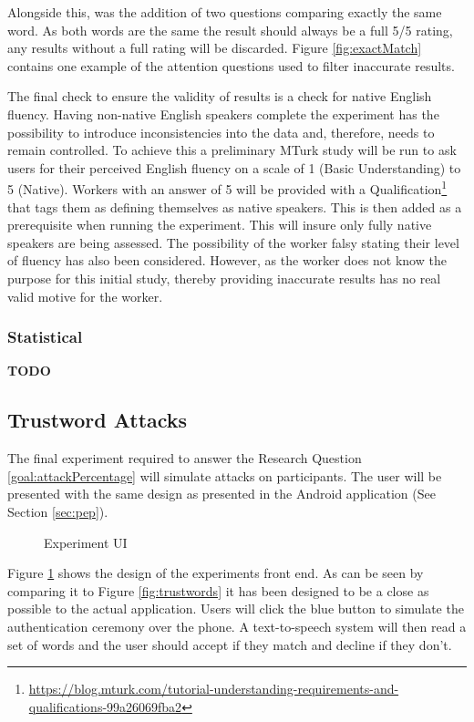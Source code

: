 Alongside this, was the addition of two questions comparing exactly the same word. As both words are the same the result should always be a full 5/5 rating, any results without a full rating will be discarded. Figure \ref{fig:exactMatch} contains one example of the attention questions used to filter inaccurate results.

The final check to ensure the validity of results is a check for native 
English fluency. Having non-native English speakers complete the 
experiment has the possibility to introduce inconsistencies into the 
data and, therefore, needs to remain controlled. To achieve this a 
preliminary MTurk study will be run to ask users for their perceived 
English fluency on a scale of 1 (Basic Understanding) to 5 (Native). 
Workers with an answer of 5 will be provided with a 
Qualification\footnote{\url{https://blog.mturk.com/tutorial-understanding-requirements-and-qualifications-99a26069fba2}} 
that tags them as defining themselves as native speakers. This is then 
added as a prerequisite when running the experiment. This will insure 
only fully native speakers are being assessed. The possibility of the 
worker falsy stating their level of fluency has also been considered. 
However, as the worker does not know the purpose for this initial study,
thereby providing inaccurate results has no real valid motive for the 
worker.

\subsubsection{Statistical}
\textbf{TODO}

\newpage

\subsection{Trustword Attacks}

The final experiment required to answer the Research Question \ref{goal:attackPercentage} will simulate attacks on participants. The user will be presented with the same design as presented in the \pep Android application (See Section \ref{sec:pep}).

\begin{figure}[h!]
    \centering
    \caption{Experiment UI}
    \label{fig:expID}
\end{figure}

Figure \ref{fig:expID} shows the design of the experiments front end. As can be seen by comparing it to Figure \ref{fig:trustwords} it has been designed to be a close as possible to the actual application. Users will click the blue button to simulate the authentication ceremony over the phone. A text-to-speech system will then read a set of words and the user should accept if they match and decline if they don't.

